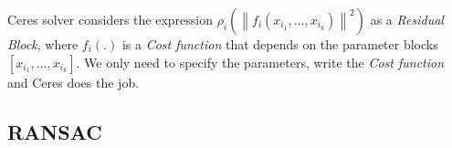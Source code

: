 Ceres solver considers the expression $\rho_i \left(\left\lVert f_i(x_{i_1}, ..., x_{i_k})  \right\rVert^2 \right)$ as a \emph{Residual Block}, where $f_i(.)$ is a \emph{Cost function} that depends on the parameter blocks $[x_{i_1}, ..., x_{i_k}]$.
We only need to specify the parameters, write the \emph{Cost function} and Ceres does the job.


\subsection{RANSAC}
